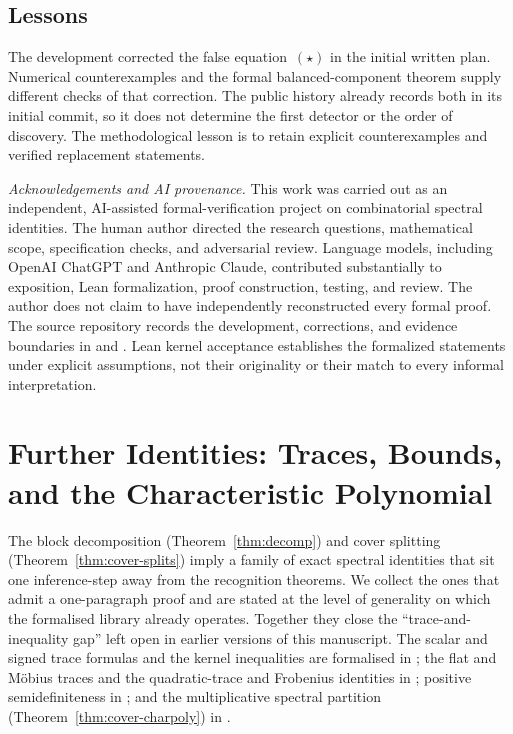 \documentclass[11pt,a4paper]{amsart}
\theoremstyle{plain}
\theoremstyle{definition}
\theoremstyle{remark}
\begin{document}
\subsection*{Lessons}

The development corrected the false equation~$(\star)$ in the initial
written plan. Numerical counterexamples and the formal balanced-component
theorem supply different checks of that correction. The public history
already records both in its initial commit, so it does not determine
the first detector or the order of discovery. The methodological lesson
is to retain explicit counterexamples and verified replacement statements.

\bigskip

\noindent\textit{Acknowledgements and AI provenance.} This work was carried
out as an independent, AI-assisted formal-verification project on
combinatorial spectral identities. The human author directed the research
questions, mathematical scope, specification checks, and adversarial
review. Language models, including OpenAI ChatGPT and Anthropic Claude,
contributed substantially to exposition, Lean formalization, proof
construction, testing, and review. The author does not claim to have
independently reconstructed every formal proof. The source repository
records the development, corrections, and evidence boundaries in
 and .
Lean kernel acceptance establishes the formalized statements under
explicit assumptions, not their originality or their match to every
informal interpretation.

\section{Further Identities: Traces, Bounds, and the
Characteristic Polynomial}\label{sec:bounds}

The block decomposition (Theorem~\ref{thm:decomp}) and cover splitting
(Theorem~\ref{thm:cover-splits}) imply a family of exact spectral
identities that sit one inference-step away from the recognition
theorems. We collect the ones that admit a one-paragraph proof and
are stated at the level of generality on which the formalised
library already operates. Together they close the
``trace-and-inequality gap'' left open in earlier versions of this
manuscript. The scalar and signed trace formulas and the kernel
inequalities are formalised in ;
the flat and Möbius traces and the quadratic-trace and Frobenius
identities in ;
positive semidefiniteness in ;
and the multiplicative spectral partition
(Theorem~\ref{thm:cover-charpoly}) in
.
\end{document}
